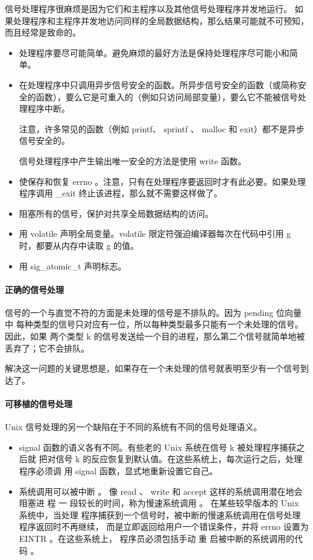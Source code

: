 信号处理程序很麻烦是因为它们和主程序以及其他信号处理程序并发地运行。
如果处理程序和主程序并发地访问同样的全局数据结构，那么结果可能就不可预知，而且经常是致命的。

\begin{itemize}
    \item 处理程序要尽可能简单。避免麻烦的最好方法是保持处理程序尽可能小和简单。
    \item 在处理程序中只调用异步信号安全的函数。所异步信号安全的函数（或简称安全的函数），要么它是可重入的（例如只访问局部变量），要么它不能被信号处理程序中断。

          注意，许多常见的函数（例如 printf、 sprintf 、 malloc 和 exit）都不是异步信号安全的。

          信号处理程序中产生输出唯一安全的方法是使用 write 函数。

    \item 使保存和恢复 errno 。注意，只有在处理程序要返回时才有此必要。如果处理程序调用 \_exit 终止该进程，那么就不需要这样做了。
    \item 阻塞所有的信号，保护对共享全局数据结构的访问。
    \item 用 volatile 声明全局变量。volatile 限定符强迫编译器每次在代码中引用 g 时，都要从内存中读取 g 的值。
    \item 用 sig\_atomic\_t 声明标志。
\end{itemize}

\paragraph{正确的信号处理}

信号的一个与直觉不符的方面是未处理的信号是不排队的。因为 pending 位向量中
每种类型的信号只对应有一位，所以每种类型最多只能有一个未处理的信号。因此，如果
两个类型 k 的信号发送给一个目的进程，那么第二个信号就简单地被丢弃了；它不会排队。

解决这一问题的关键思想是，如果存在一个未处理的信号就表明至少有一个信号到达了。

\paragraph{可移植的信号处理}

Unix 信号处理的另一个缺陷在于不同的系统有不同的信号处理语义。

\begin{itemize}
    \item signal 函数的语义各有不同。有些老的 Unix 系统在信号 k 被处理程序捕获之后就
          把对信号 k 的反应恢复到默认值。在这些系统上，每次运行之后，处理程序必须调
          用 signal 函数，显式地重新设置它自己。
    \item 系统调用可以被中断 。 像 read 、 write 和 accept 这样的系统调用潜在地会阻塞进
          程 一 段较长的时间，称为慢速系统调用 。 在某些较早版本的 Unix 系统中，当处理
          程序捕获到一个信号时，被中断的慢速系统调用在信号处理程序返回时不再继续，
          而是立即返回给用户一个错误条件，并将 errno 设置为 EINTR 。在这些系统上，
          程序员必须包括手动 重 启被中断的系统调用的代码 。
\end{itemize}

